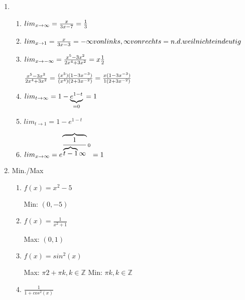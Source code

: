 \documentclass[12pt,a4paper]{scrreprt}
\newcommand{\Z}{\mathds{Z}}
\begin{document}
\begin{enumerate}
\begin{enumerate}
\end{enumerate}

\item

\begin{enumerate}

\item
$lim_{x \rightarrow \infty} = \frac{x}{3x-7}	\\
=\frac{1}{3}$

\item
$lim_{x \rightarrow 1} = \frac{x}{3x-3}	\\
=-\infty von links, \infty von rechts	\\
= n.d. weil nicht eindeutig$

\item
$lim_{x \rightarrow -\infty} = \frac{x^5-3x^2}{2x^4+3x^2}	\\
= x \frac{1}{2}$

$  \frac{x^5-3x^2}{2x^4+3x^2}	\\
= \frac{(x^5)(1-3x^{-3})}{(x^4)(2+3x^{-2})}	\\
= \frac{x(1-3x^{-3})}{1(2+3x^{-2})}$


\item
$lim_{t \rightarrow \infty} = 1-\underbrace{e^{1-t}}_{=0}	\\
=1$


\item
$lim_{t \rightarrow 1} = 1 - e^{1-t}	$



\item
$lim_{x \rightarrow \infty} = e^{\overbrace{\frac{1}{\overbrace{t-1}{\infty}}}{0}}	\\
=1$

\end{enumerate}

\item
Min./Max

\begin{enumerate}

\item
$f(x)=x^2-5$

Min: $(0,-5)$

\item
$f(x)=\frac{1}{x^2+1}$

Max: $(0,1)$

\item

$f(x)=sin^2(x)$

Max: ${\pi}{2}+\pi k, k \in \Z$
Min: $\pi k , k \in \Z$

\item

$\frac{1}{1+cos^2(x)}$

\end{enumerate}

\end{enumerate}
\end{document}
